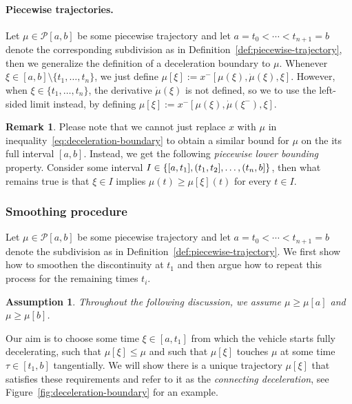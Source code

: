 \documentclass[a4paper]{article}
\theoremstyle{definition}
\newtheorem{remark}{Remark}
\theoremstyle{plain}
\newtheorem{assump}{Assumption\hspace{0.25em}\ignorespaces}
\begin{document}
\paragraph{Piecewise trajectories.}
Let $\mu \in \mathcal{P}[a, b]$ be some piecewise trajectory and let
$a = t_{0} < \cdots < t_{n+1} = b$ denote the corresponding subdivision as in
Definition~\ref{def:piecewise-trajectory}, then we generalize the definition of
a deceleration boundary to $\mu$.
%
Whenever $\xi \in [a,b] \setminus \{ t_{1}, \dots, t_{n}\}$, we just define
$\mu[\xi] := x^{-}[\mu(\xi), \dot{\mu}(\xi), \xi]$.
%
However, when $\xi \in \{ t_{1}, \dots, t_{n}\}$, the derivative
$\dot{\mu}(\xi)$ is not defined, so we to use the left-sided limit instead, by
defining $\mu[\xi] := x^{-}[\mu(\xi), \dot{\mu}(\xi^{-}), \xi]$.

\begin{remark}\label{rem:lower-bound-piecewise}
  Please note that we cannot just replace $x$ with $\mu$ in inequality~\eqref{eq:deceleration-boundary} to
  obtain a similar bound for $\mu$ on the its full interval $[a,b]$.
  Instead, we get the following \emph{piecewise lower bounding} property.
  Consider some interval
  $I \in \{ [a, t_{1}], (t_{1},t_{2}], \dots, (t_{n},b] \}$, then what
  remains true is that $\xi \in I$ implies $\mu(t) \geq \mu[\xi](t)$ for every $t \in I$.
\end{remark}


\subsubsection{Smoothing procedure}\label{sec:smoothing}
Let $\mu \in \mathcal{P}[a,b]$ be some piecewise trajectory and let
$a = t_{0} < \cdots < t_{n+1} = b$ denote the subdivision as in Definition~\ref{def:piecewise-trajectory}.
%
We first show how to smoothen the discontinuity at $t_{1}$ and then argue how to
repeat this process for the remaining times $t_{i}$.

\begin{assump}\label{assump2}
  Throughout the following discussion, we assume $\mu \geq \mu[a]$ and $\mu \geq \mu[b]$.
\end{assump}

Our aim is to choose some time $\xi \in [a,t_{1}]$ from which the vehicle starts
fully decelerating, such that $\mu[\xi] \leq \mu$ and such that $\mu[\xi]$ touches $\mu$ at some time
$\tau \in [t_{1}, b]$ tangentially.
%
We will show there is a unique trajectory $\mu[\xi]$ that satisfies these requirements
and refer to it as the \emph{connecting deceleration}, see
Figure~\ref{fig:deceleration-boundary} for an example.
\end{document}
